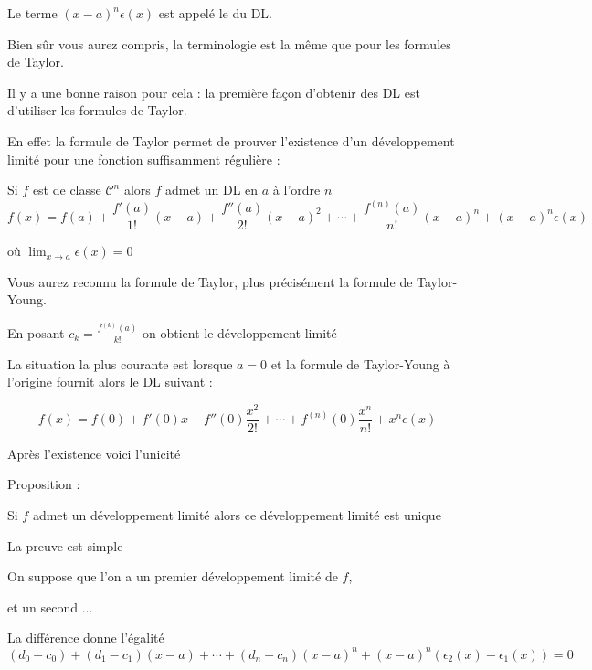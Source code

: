 \change

Le terme $(x-a)^n\epsilon(x)$ est appelé le  du DL.

Bien sûr vous aurez compris, la terminologie est la même que pour les formules de Taylor.

Il y a une bonne raison pour cela : la première façon d'obtenir des DL est d'utiliser les formules de Taylor.

\change

En effet la formule de Taylor permet de prouver l'existence d'un développement limité
pour une fonction suffisamment régulière : 

Si $f$ est de classe $\mathcal{C}^n$ 
alors $f$ admet un DL en $a$ à l'ordre $n$
$$f(x)= f(a)+\frac{f'(a)}{1!}(x-a)+ \frac{f''(a)}{2!}(x-a)^2+\cdots
+\frac{f^{(n)}(a)}{n!}(x-a)^n+(x-a)^n\epsilon(x)$$

où $\lim_{x\to a}\epsilon(x)=0$

\change

Vous aurez reconnu la formule de Taylor, plus précisément la formule de Taylor-Young.

\change

En posant $c_k = \frac{f^{(k)}(a)}{k!}$ on obtient le développement limité

\change

La situation la plus courante est lorsque $a=0$ et
la formule de Taylor-Young à l'origine fournit alors le DL suivant :

$$f(x)= f(0)+f'(0)x+f''(0)\frac{x^2}{2!}+\cdots
+f^{(n)}(0)\frac{x^n}{n!} + x^n\epsilon(x)$$

\diapo

Après l'existence voici l'unicité 

Proposition :

Si $f$ admet un développement limité alors ce développement limité est unique

\change

La preuve est simple

On suppose que l'on a un premier développement limité de $f$,




\change

et un second ...



\change

La différence donne l'égalité 
$
(d_0-c_0)+(d_1-c_1)(x-a)+\cdots+(d_n-c_n)(x-a)^n+(x-a)^n(\epsilon_2(x)-\epsilon_1(x))=0
$

